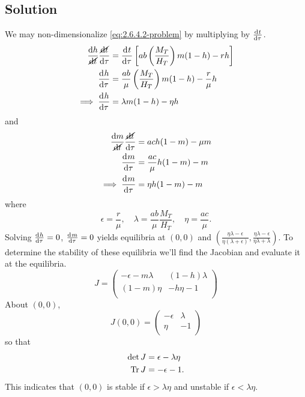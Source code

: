 \documentclass[12pt]{article}
\begin{document}
\subsection*{Solution}
We may non-dimensionalize \cref{eq:2.6.4.2-problem} by multiplying by
$\frac{\mathrm{d}^{} {t}}{\mathrm{d}{\tau}^{}}$.
\begin{equation*}
  \begin{aligned}
    \frac{\mathrm{d}{h}}{\cancel{\mathrm{d}{t}}}\frac{\cancel{\mathrm{d}{t}}}{\mathrm{d}{\tau}} &=
    \frac{\mathrm{d}^{} {t}}{\mathrm{d}{\tau}^{}}\left[ab\left(\frac{M_T}{H_T}\right)m(1-h)-rh \right] \\
    \frac{\mathrm{d}^{} {h}}{\mathrm{d}{\tau}^{}} &= \frac{ab}{\mu}\left(\frac{M_T}{H_T}\right)m(1-h) -
    \frac{r}{\mu}h \\
    \implies \frac{\mathrm{d}^{} {h}}{\mathrm{d}{\tau}^{}} &= \lambda m(1-h) - \eta h \\
  \end{aligned}
\end{equation*}
and
\begin{equation*}
  \begin{aligned}
    \frac{\mathrm{d}{m}}{\cancel{\mathrm{d}{t}}}\frac{\cancel{\mathrm{d}{t}}}{\mathrm{d}{\tau}} &= ach(1-m)-\mu m \\
    \frac{\mathrm{d}^{} {m}}{\mathrm{d}{\tau}^{}} &= \frac{ac}{\mu}h(1-m) - m \\
    \implies \frac{\mathrm{d}^{} {m}}{\mathrm{d}{\tau}^{}} &= \eta h(1-m) - m \\
  \end{aligned}
\end{equation*}
where
\begin{equation*}
  \epsilon=\frac{r}{\mu},\quad \lambda=\frac{ab}{\mu}\frac{M_T}{H_T},\quad\eta=\frac{ac}{\mu}.
\end{equation*}
\newcommand{\otherequilibrium}{\left(\frac{\eta\lambda-\epsilon}{\eta(\lambda+\epsilon)},
  \frac{\eta\lambda-\epsilon}{\eta\lambda+\lambda}\right)}
Solving $\frac{\mathrm{d}^{} {h}}{\mathrm{d}{\tau}^{}}=0$, $\frac{\mathrm{d}^{} {m}}{\mathrm{d}{\tau}^{}}=0$ yields equilibria at $(0,0)$ and
$\otherequilibrium$. To determine the stability of these equilibria we'll find
the Jacobian and evaluate it at the equilibria.
\begin{equation*}
  J =
  \begin{pmatrix}
    -\epsilon-m\lambda & (1-h)\lambda \\
    (1-m)\eta  & -h\eta-1 \\
  \end{pmatrix}
\end{equation*}
About $(0,0)$,
\begin{equation*}
  J(0,0) =
  \begin{pmatrix}
    -\epsilon & \lambda \\
    \eta & -1 \\
  \end{pmatrix}
\end{equation*}
so that
\begin{equation*}
  \begin{aligned}
    \det{J} &= \epsilon-\lambda\eta \\
    \operatorname{Tr}{J} &= -\epsilon-1. \\
  \end{aligned}
\end{equation*}
This indicates that $(0,0)$ is stable if $\epsilon>\lambda\eta$ and unstable if
$\epsilon<\lambda\eta$.
\end{document}
